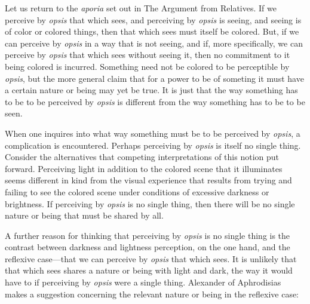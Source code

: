 Let us return to the \emph{aporia} set out in The Argument from Relatives. If we perceive by \emph{opsis} that which sees, and perceiving by \emph{opsis} is seeing, and seeing is of color or colored things, then that which sees must itself be colored. But, if we can perceive by \emph{opsis} in a way that is not seeing, and if, more specifically, we can perceive by \emph{opsis} that which sees without seeing it, then no commitment to it being colored is incurred. Something need not be colored to be perceptible by \emph{opsis}, but the more general claim that for a power to be of someting it must have a certain nature or being may yet be true. It is just that the way something has to be to be perceived by \emph{opsis} is different from the way something has to be to be seen.

When one inquires into what way something must be to be perceived by \emph{opsis}, a complication is encountered. Perhaps perceiving by \emph{opsis} is itself no single thing. Consider the alternatives that competing interpretations of this notion put forward. Perceiving light in addition to the colored scene that it illuminates seems different in kind from the visual experience that results from trying and failing to see the colored scene under conditions of excessive darkness or brightness. If perceiving by \emph{opsis} is no single thing, then there will be no single nature or being that must be shared by all. 

A further reason for thinking that perceiving by \emph{opsis} is no single thing is the contrast between darkness and lightness perception, on the one hand, and the reflexive case—that we can perceive by \emph{opsis} that which sees. It is unlikely that that which sees shares a nature or being with light and dark, the way it would have to if perceiving by \emph{opsis} were a single thing. Alexander of Aphrodisias makes a suggestion concerning the relevant nature or being in the reflexive case:
\begin{quote}
	
\end{quote}


